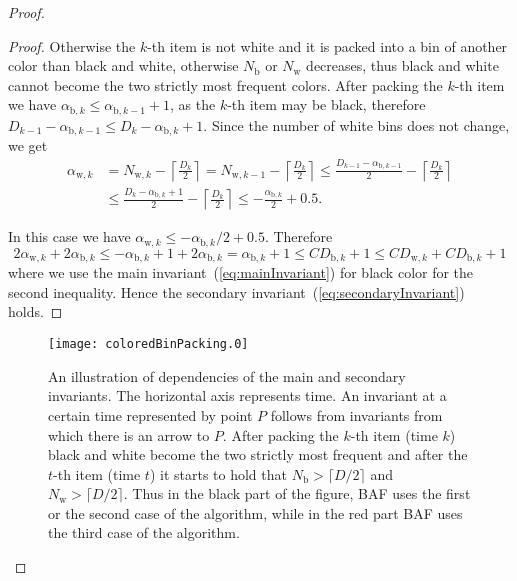 \documentclass[11pt,a4paper]{article}
\def\vari#1{\mathit{#1}}
\begin{document}
\begin{proof}
\begin{proof}
Otherwise the $k$-th item is not white and it is packed into a bin of another color than black and white,
otherwise $N_{\mathrm{b}}$ or $N_{\mathrm{w}}$ decreases, thus black
and white cannot become the two strictly most frequent colors. After packing the $k$-th item
we have $\alpha_{\mathrm{b},k} \leq \alpha_{\mathrm{b},k-1} + 1$, as the $k$-th item may be black,
therefore $D_{k-1} - \alpha_{\mathrm{b},k-1} \leq D_{k} - \alpha_{\mathrm{b},k} + 1$.
Since the number of white bins does not change, we get
\begin{align*}
\alpha_{\mathrm{w},k} &= N_{\mathrm{w},k} - \left\lceil\frac{D_{k}}{2}\right\rceil
= N_{\mathrm{w},k-1} - \left\lceil\frac{D_{k}}{2}\right\rceil
\leq \frac{D_{k-1} - \alpha_{\mathrm{b},k-1}}{2} - \left\lceil\frac{D_{k}}{2}\right\rceil \\
&\leq \frac{D_{k} - \alpha_{\mathrm{b},k} + 1}{2} - \left\lceil\frac{D_{k}}{2}\right\rceil
\leq -\frac{\alpha_{\mathrm{b},k}}{2} + 0.5.
\end{align*}

In this case we have $\alpha_{\mathrm{w},k}\leq -\alpha_{\mathrm{b},k}/2 + 0.5$.
Therefore
$$2\alpha_{\mathrm{w},k}+2\alpha_{\mathrm{b},k}
\leq -\alpha_{\mathrm{b},k} + 1 + 2\alpha_{\mathrm{b},k}
= \alpha_{\mathrm{b},k} + 1 \leq \vari{CD}_{\mathrm{b},k} + 1
\leq \vari{CD}_{\mathrm{w},k} + \vari{CD}_{\mathrm{b},k} + 1
$$
where we use the main invariant~(\ref{eq:mainInvariant}) for black color for the second inequality.
Hence the secondary invariant~(\ref{eq:secondaryInvariant}) holds.
\end{proof}

\begin{figure}[!ht]
\centerline{\texttt{[image: coloredBinPacking.0]}}
\caption{An illustration of dependencies of the main and secondary invariants.
The horizontal axis represents time. 
An invariant at a certain time represented by point $P$ follows from invariants from which there is an arrow to $P$.
After packing the $k$-th item (time $k$) black and white become the two strictly most frequent and
after the $t$-th item (time $t$) it starts to hold that $N_{\mathrm{b}} > \lceil D/2\rceil$ and
$N_{\mathrm{w}} > \lceil D/2\rceil$.
Thus in the black part of the figure, BAF uses the first or the second case of the algorithm,
while in the red part BAF uses the third case of the algorithm.}
\label{fig:OptAlgInvariants}
\end{figure}


\end{proof}
\end{document}
